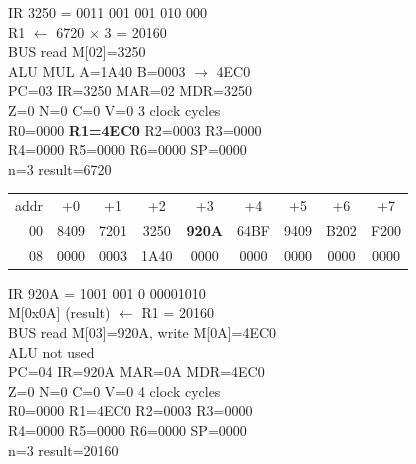 \noindent\begin{tcolorbox}[stepbox, title={Step 28 \hfill PC 02 \quad MUL R1, R1, R2}]
\textcolor{dim}{IR} 3250 = 0011 001 001 010 000\\
R1 $\leftarrow$ 6720 $\times$ 3 = 20160\\
\textcolor{dim}{BUS} read M[02]=3250\\
\textcolor{dim}{ALU} MUL A=1A40 B=0003 $\rightarrow$ 4EC0\\
PC=03 IR=3250 MAR=02 MDR=3250\\
Z=0 N=0 C=0 V=0 \hfill \textcolor{dim}{3 clock cycles}\\
R0=0000 \textcolor{wrt}{\textbf{R1=4EC0}} R2=0003 R3=0000\\
R4=0000 R5=0000 R6=0000 SP=0000\\
\textcolor{dim}{n=3  result=6720}\\[1pt]
{\setlength{\tabcolsep}{1.6pt}\begin{tabular}{@{}r*{8}{c}@{}}
\textcolor{dim}{addr} & \textcolor{dim}{+0} & \textcolor{dim}{+1} & \textcolor{dim}{+2} & \textcolor{dim}{+3} & \textcolor{dim}{+4} & \textcolor{dim}{+5} & \textcolor{dim}{+6} & \textcolor{dim}{+7}\\
\textcolor{dim}{00} & 8409 & 7201 & 3250 & \cellcolor{pcc}\textbf{920A} & 64BF & 9409 & B202 & F200\\
\textcolor{dim}{08} & 0000 & \cellcolor{datac}0003 & \cellcolor{datac}1A40 & 0000 & 0000 & 0000 & 0000 & 0000\\
\end{tabular}}
\end{tcolorbox}\hfill\begin{tcolorbox}[stepbox, title={Step 29 \hfill PC 03 \quad ST R1, result}]
\textcolor{dim}{IR} 920A = 1001 001 0 00001010\\
M[0x0A] (result) $\leftarrow$ R1 = 20160\\
\textcolor{dim}{BUS} read M[03]=920A, \textcolor{wrt}{write M[0A]=4EC0}\\
\textcolor{dim}{ALU} \textcolor{dim}{not used}\\
PC=04 IR=920A MAR=0A MDR=4EC0\\
Z=0 N=0 C=0 V=0 \hfill \textcolor{dim}{4 clock cycles}\\
R0=0000 R1=4EC0 R2=0003 R3=0000\\
R4=0000 R5=0000 R6=0000 SP=0000\\
\textcolor{dim}{n=3  result=20160}\\[1pt]
{\setlength{\tabcolsep}{1.6pt}\begin{tabular}{@{}r*{8}{c}@{}}

\end{tabular}}
\end{tcolorbox}

